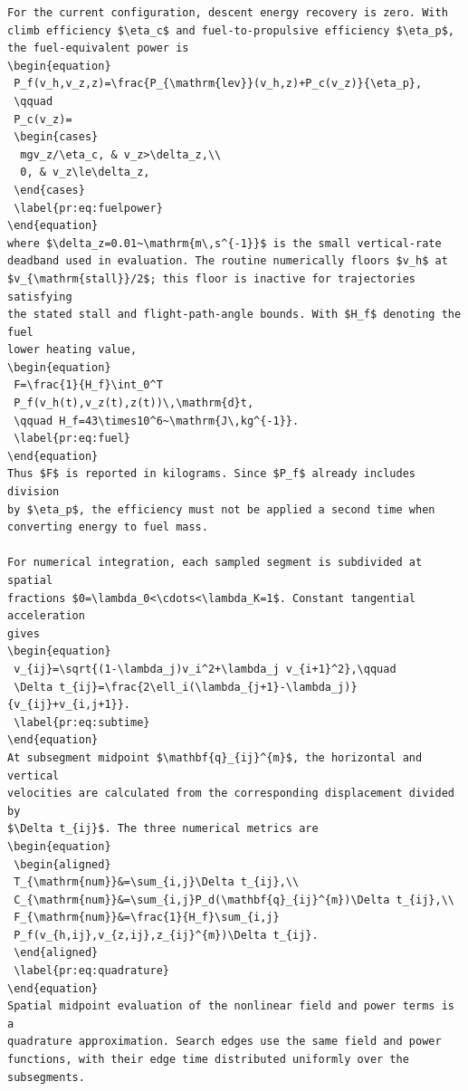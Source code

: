 \documentclass[12pt]{article}
\begin{document}
\begin{verbatim}
For the current configuration, descent energy recovery is zero. With
climb efficiency $\eta_c$ and fuel-to-propulsive efficiency $\eta_p$,
the fuel-equivalent power is
\begin{equation}
 P_f(v_h,v_z,z)=\frac{P_{\mathrm{lev}}(v_h,z)+P_c(v_z)}{\eta_p},
 \qquad
 P_c(v_z)=
 \begin{cases}
  mgv_z/\eta_c, & v_z>\delta_z,\\
  0, & v_z\le\delta_z,
 \end{cases}
 \label{pr:eq:fuelpower}
\end{equation}
where $\delta_z=0.01~\mathrm{m\,s^{-1}}$ is the small vertical-rate
deadband used in evaluation. The routine numerically floors $v_h$ at
$v_{\mathrm{stall}}/2$; this floor is inactive for trajectories satisfying
the stated stall and flight-path-angle bounds. With $H_f$ denoting the fuel
lower heating value,
\begin{equation}
 F=\frac{1}{H_f}\int_0^T
 P_f(v_h(t),v_z(t),z(t))\,\mathrm{d}t,
 \qquad H_f=43\times10^6~\mathrm{J\,kg^{-1}}.
 \label{pr:eq:fuel}
\end{equation}
Thus $F$ is reported in kilograms. Since $P_f$ already includes division
by $\eta_p$, the efficiency must not be applied a second time when
converting energy to fuel mass.

For numerical integration, each sampled segment is subdivided at spatial
fractions $0=\lambda_0<\cdots<\lambda_K=1$. Constant tangential acceleration
gives
\begin{equation}
 v_{ij}=\sqrt{(1-\lambda_j)v_i^2+\lambda_j v_{i+1}^2},\qquad
 \Delta t_{ij}=\frac{2\ell_i(\lambda_{j+1}-\lambda_j)}{v_{ij}+v_{i,j+1}}.
 \label{pr:eq:subtime}
\end{equation}
At subsegment midpoint $\mathbf{q}_{ij}^{m}$, the horizontal and vertical
velocities are calculated from the corresponding displacement divided by
$\Delta t_{ij}$. The three numerical metrics are
\begin{equation}
 \begin{aligned}
 T_{\mathrm{num}}&=\sum_{i,j}\Delta t_{ij},\\
 C_{\mathrm{num}}&=\sum_{i,j}P_d(\mathbf{q}_{ij}^{m})\Delta t_{ij},\\
 F_{\mathrm{num}}&=\frac{1}{H_f}\sum_{i,j}
 P_f(v_{h,ij},v_{z,ij},z_{ij}^{m})\Delta t_{ij}.
 \end{aligned}
 \label{pr:eq:quadrature}
\end{equation}
Spatial midpoint evaluation of the nonlinear field and power terms is a
quadrature approximation. Search edges use the same field and power
functions, with their edge time distributed uniformly over the subsegments.


\end{verbatim}
\end{document}
